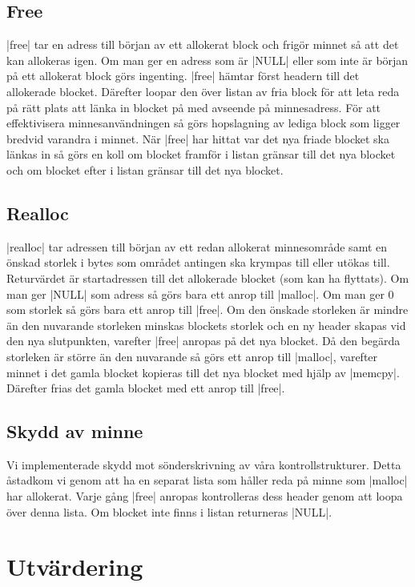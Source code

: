 \documentclass[paper=a4, fontsize=11pt]{scrartcl} %
\numberwithin{equation}{section} %
\numberwithin{figure}{section} %
\numberwithin{table}{section} %
\begin{document}
\subsection{Free}
|free| tar en adress till början av ett allokerat block och frigör minnet så
att det kan allokeras igen.
Om man ger en adress som är |NULL| eller som inte är början på ett allokerat
block görs ingenting.
|free| hämtar först headern till det allokerade blocket.
Därefter loopar den över listan av fria block för att leta reda på rätt plats
att länka in blocket på med avseende på minnesadress.
För att effektivisera minnesanvändningen så görs hopslagning av lediga block
som ligger bredvid varandra i minnet.
När |free| har hittat var det nya friade blocket ska länkas in så görs en koll
om blocket framför i listan gränsar till det nya blocket och om blocket
efter i listan gränsar till det nya blocket.

\subsection{Realloc}
|realloc| tar adressen till början av ett redan allokerat minnesområde samt
en önskad storlek i bytes som området antingen ska krympas till eller utökas
till.
Returvärdet är startadressen till det allokerade blocket (som kan ha flyttats).
Om man ger |NULL| som adress så görs bara ett anrop till |malloc|.
Om man ger 0 som storlek så görs bara ett anrop till |free|.
Om den önskade storleken är mindre än den nuvarande storleken minskas blockets
storlek och en ny header skapas vid den nya slutpunkten, varefter |free| anropas på
det nya blocket.
Då den begärda storleken är större än den nuvarande så görs ett anrop till
|malloc|, varefter minnet i det gamla blocket kopieras till det nya blocket
med hjälp av |memcpy|.
Därefter frias det gamla blocket med ett anrop till |free|.

\subsection{Skydd av minne} 
Vi implementerade skydd mot sönderskrivning av våra kontrollstrukturer. 
Detta åstadkom vi genom att ha en separat lista som håller reda på minne som
|malloc| har allokerat.
Varje gång |free| anropas kontrolleras dess header genom att loopa över denna
lista.
Om blocket inte finns i listan returneras |NULL|.




\section{Utvärdering}
\end{document}
